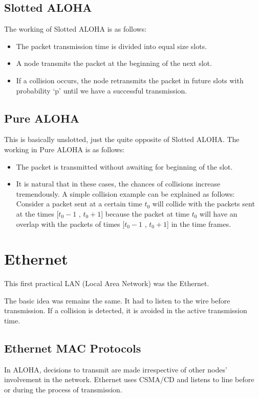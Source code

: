 \documentclass[12pt]{article}
\begin{document}
\subsection{Slotted ALOHA}
The working of Slotted ALOHA is as follows: 
\begin{itemize}
    \item The packet transmission time is divided into equal size slots.
    \item A node transmits the packet at the beginning of the next slot.
    \item If a collision occurs, the node retransmits the packet in future slots with probability ‘p’ until we have a successful transmission.
\end{itemize}

\subsection{Pure ALOHA}
This is basically unslotted, just the quite opposite of Slotted ALOHA. The working in Pure ALOHA is as follows:
\begin{itemize}
    \item The packet is transmitted without awaiting for beginning of the slot.
    \item It is natural that in these cases, the chances of collisions increase tremendously. A simple collision example can be explained as follows: \\ 
    Consider a packet sent at a certain time $t_0$ will collide with the packets sent at the times [$t_0-1$ , $t_0+1$] because the packet at time $t_0$ will have an overlap with the packets of times [$t_0-1$ , $t_0+1$] in the time frames.
    
\end{itemize}


\section{Ethernet}

This first practical LAN (Local Area Network) was the Ethernet.

The basic idea was remains the same. It had to listen to the wire before transmission. If a collision is detected, it is avoided in the active transmission time.

\subsection{Ethernet MAC Protocols}
In ALOHA, decisions to transmit are made irrespective of other nodes' involvement in the network. Ethernet uses CSMA/CD and listens to line before or during the process of transmission. \\
\end{document}
